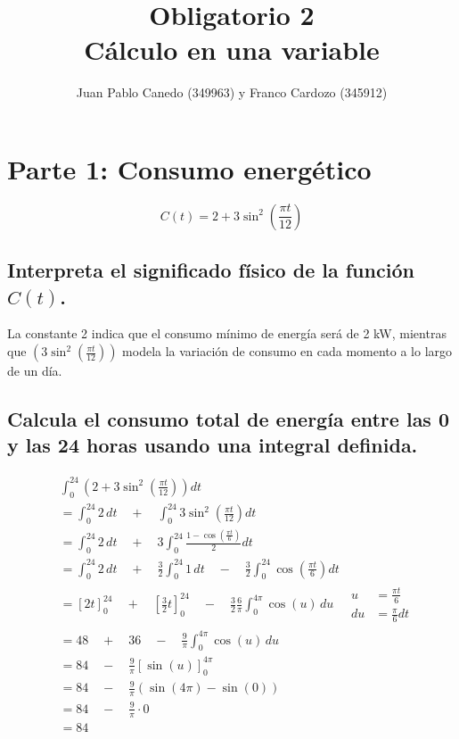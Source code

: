 \documentclass[11pt, a4paper]{article}
\title{Obligatorio 2 \\ Cálculo en una variable}
\author{Juan Pablo Canedo (349963) y Franco Cardozo (345912)}
\date{}
\begin{document}
\maketitle
\clearpage

\section{Parte 1: Consumo energético}

$$C(t) = 2 + 3 \sin^2 \left(\frac{\pi t}{12}\right)$$


\subsection{Interpreta el significado físico de la función $C(t)$.}
La constante 2 indica que el consumo mínimo de energía será de 2 kW, mientras que $(3 \sin^2 \left(\frac{\pi t}{12}\right))$ modela la variación de consumo en cada momento a lo largo de un día.

\subsection{ Calcula el consumo total de energía entre las 0 y las 24 horas usando una integral definida.}

\begin{align*}
    & \int_{0}^{24} \left(2 + 3\sin^2\left(\frac{\pi t}{12}\right)\right) dt \\
    &= \int_{0}^{24} 2 \, dt \quad + \quad \int_{0}^{24} 3\sin^2\left(\frac{\pi t}{12}\right) dt \\
    &= \int_{0}^{24} 2 \, dt \quad + \quad 3\int_{0}^{24} \frac{1 - \cos\left(\frac{\pi t}{6}\right)}{2} dt \\
    &= \int_{0}^{24} 2 \, dt \quad + \quad \frac{3}{2}\int_{0}^{24} 1 \, dt \quad - \quad \frac{3}{2}\int_{0}^{24} \cos\left(\frac{\pi t}{6}\right) dt \\
    &= \left[2t\right]_{0}^{24} \quad + \quad \left[\frac{3}{2}t\right]_{0}^{24} \quad - \quad \frac{3}{2} \frac{6}{\pi} \int_{0}^{4\pi} \cos(u) \, du \quad
    \boxed{
        \begin{aligned}
            u &= \frac{\pi t}{6} \\
            du &= \frac{\pi}{6} dt
        \end{aligned}
    } \\
    &= 48 \quad + \quad 36 \quad - \quad \frac{9}{\pi} \int_{0}^{4\pi} \cos(u) \, du \\
    &= 84 \quad - \quad \frac{9}{\pi} \left[\sin(u)\right]_{0}^{4\pi} \\
    &= 84 \quad - \quad \frac{9}{\pi} (\sin(4\pi) - \sin(0)) \\
    &= 84 \quad - \quad \frac{9}{\pi} \cdot 0 \\
    &= \boxed{84}
\end{align*}
\end{document}
